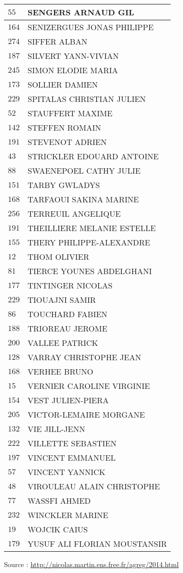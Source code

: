 \begin{xltabular}{\linewidth}{|l|X|}
    \hline
    $55$ & SENGERS ARNAUD GIL \\
    \hline
    $164$ & SENIZERGUES JONAS PHILIPPE \\
    \hline
    $274$ & SIFFER ALBAN \\
    \hline
    $187$ & SILVERT YANN-VIVIAN \\
    \hline
    $245$ & SIMON ELODIE MARIA \\
    \hline
    $173$ & SOLLIER DAMIEN \\
    \hline
    $229$ & SPITALAS CHRISTIAN JULIEN \\
    \hline
    $52$ & STAUFFERT MAXIME \\
    \hline
    $142$ & STEFFEN ROMAIN \\
    \hline
    $191$ & STEVENOT ADRIEN \\
    \hline
    $43$ & STRICKLER EDOUARD ANTOINE \\
    \hline
    $88$ & SWAENEPOEL CATHY JULIE \\
    \hline
    $151$ & TARBY GWLADYS \\
    \hline
    $168$ & TARFAOUI SAKINA MARINE \\
    \hline
    $256$ & TERREUIL ANGELIQUE \\
    \hline
    $191$ & THEILLIERE MELANIE ESTELLE \\
    \hline
    $155$ & THERY PHILIPPE-ALEXANDRE \\
    \hline
    $12$ & THOM OLIVIER \\
    \hline
    $81$ & TIERCE YOUNES ABDELGHANI \\
    \hline
    $177$ & TINTINGER NICOLAS \\
    \hline
    $229$ & TIOUAJNI SAMIR \\
    \hline
    $86$ & TOUCHARD FABIEN \\
    \hline
    $188$ & TRIOREAU JEROME \\
    \hline
    $200$ & VALLEE PATRICK \\
    \hline
    $128$ & VARRAY CHRISTOPHE JEAN \\
    \hline
    $168$ & VERHEE BRUNO \\
    \hline
    $15$ & VERNIER CAROLINE VIRGINIE \\
    \hline
    $154$ & VEST JULIEN-PIERA \\
    \hline
    $205$ & VICTOR-LEMAIRE MORGANE \\
    \hline
    $132$ & VIE JILL-JENN \\
    \hline
    $222$ & VILLETTE SEBASTIEN \\
    \hline
    $197$ & VINCENT EMMANUEL \\
    \hline
    $57$ & VINCENT YANNICK \\
    \hline
    $48$ & VIROULEAU ALAIN CHRISTOPHE \\
    \hline
    $77$ & WASSFI AHMED \\
    \hline
    $232$ & WINCKLER MARINE \\
    \hline
    $19$ & WOJCIK CAIUS \\
    \hline
    $179$ & YUSUF ALI FLORIAN MOUSTANSIR \\
    \hline
  \end{xltabular}

  \begin{flushright}
    {\tiny Source : \url{http://nicolas.martin.ens.free.fr/agreg/2014.html}}
  \end{flushright}

